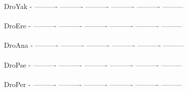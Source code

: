 \documentclass[11pt,twoside,reqno,a4paper]{article}
\begin{document}
{DroYak	-	----------	----------	----------	----------	----------	---------\\
\hspace*{7\charwidth}\hspace*{1\charwidth}\hspace*{1\charwidth}\hspace*{1\charwidth}\hspace*{1\charwidth}\hspace*{1\charwidth}\hspace*{1\charwidth}\\
DroEre	-	----------	----------	----------	----------	----------	---------\\
\hspace*{7\charwidth}\hspace*{1\charwidth}\hspace*{1\charwidth}\hspace*{1\charwidth}\hspace*{1\charwidth}\hspace*{1\charwidth}\hspace*{1\charwidth}\\
DroAna	-	----------	----------	----------	----------	----------	---------\\
\hspace*{7\charwidth}\hspace*{1\charwidth}\hspace*{1\charwidth}\hspace*{1\charwidth}\hspace*{1\charwidth}\hspace*{1\charwidth}\hspace*{1\charwidth}\\
DroPse	-	----------	----------	----------	----------	----------	---------\\
\hspace*{7\charwidth}\hspace*{1\charwidth}\hspace*{1\charwidth}\hspace*{1\charwidth}\hspace*{1\charwidth}\hspace*{1\charwidth}\hspace*{1\charwidth}\\
DroPer	-	----------	----------	----------	----------	----------	---------\\
\hspace*{7\charwidth}\hspace*{1\charwidth}\hspace*{1\charwidth}\hspace*{1\charwidth}\hspace*{1\charwidth}\hspace*{1\charwidth}\hspace*{1\charwidth}\\
}
\end{document}
